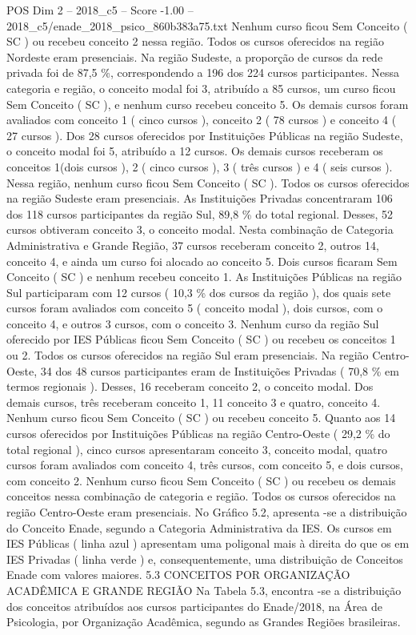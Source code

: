 \begin{textsample}{POS Dim 2 – 2018\_c5 – Score -1.00 – 2018\_c5/enade\_2018\_psico\_860b383a75.txt}
Nenhum curso ficou Sem Conceito ( SC ) ou recebeu conceito 2 nessa região.
Todos os cursos oferecidos na região Nordeste eram presenciais.
Na região Sudeste, a proporção de cursos da rede privada foi de 87,5 \%, correspondendo a 196 dos 224 cursos participantes.
Nessa categoria e região, o conceito modal foi 3, atribuído a 85 cursos, um curso ficou Sem Conceito ( SC ), e nenhum curso recebeu conceito 5.
Os demais cursos foram avaliados com conceito 1 ( cinco cursos ), conceito 2 ( 78 cursos ) e conceito 4 ( 27 cursos ).
Dos 28 cursos oferecidos por Instituições Públicas na região Sudeste, o conceito modal foi 5, atribuído a 12 cursos.
Os demais cursos receberam os conceitos 1(dois cursos ), 2 ( cinco cursos ), 3 ( três cursos ) e 4 ( seis cursos ).
Nessa região, nenhum curso ficou Sem Conceito ( SC ).
Todos os cursos oferecidos na região Sudeste eram presenciais.
As Instituições Privadas concentraram 106 dos 118 cursos participantes da região Sul, 89,8 \% do total regional.
Desses, 52 cursos obtiveram conceito 3, o conceito modal.
Nesta combinação de Categoria Administrativa e Grande Região, 37 cursos receberam conceito 2, outros 14, conceito 4, e ainda um curso foi alocado ao conceito 5.
Dois cursos ficaram Sem Conceito ( SC ) e nenhum recebeu conceito 1.
As Instituições Públicas na região Sul participaram com 12 cursos ( 10,3 \% dos cursos da região ), dos quais sete cursos foram avaliados com conceito 5 ( conceito modal ), dois cursos, com o conceito 4, e outros 3 cursos, com o conceito 3.
Nenhum curso da região Sul oferecido por IES Públicas ficou Sem Conceito ( SC ) ou recebeu os conceitos 1 ou 2.
Todos os cursos oferecidos na região Sul eram presenciais.
Na região Centro-Oeste, 34 dos 48 cursos participantes eram de Instituições Privadas ( 70,8 \% em termos regionais ).
Desses, 16 receberam conceito 2, o conceito modal.
Dos demais cursos, três receberam conceito 1, 11 conceito 3 e quatro, conceito 4.
Nenhum curso ficou Sem Conceito ( SC ) ou recebeu conceito 5.
Quanto aos 14 cursos oferecidos por Instituições Públicas na região Centro-Oeste ( 29,2 \% do total regional ), cinco cursos apresentaram conceito 3, conceito modal, quatro cursos foram avaliados com conceito 4, três cursos, com conceito 5, e dois cursos, com conceito 2.
Nenhum curso ficou Sem Conceito ( SC ) ou recebeu os demais conceitos nessa combinação de categoria e região.
Todos os cursos oferecidos na região Centro-Oeste eram presenciais.
No Gráfico 5.2, apresenta -se a distribuição do Conceito Enade, segundo a Categoria Administrativa da IES.
Os cursos em IES Públicas ( linha azul ) apresentam uma poligonal mais à direita do que os em IES Privadas ( linha verde ) e, consequentemente, uma distribuição de Conceitos Enade com valores maiores. 5.3 CONCEITOS POR ORGANIZAÇÃO ACADÊMICA E GRANDE REGIÃO Na Tabela 5.3, encontra -se a distribuição dos conceitos atribuídos aos cursos participantes do Enade/2018, na Área de Psicologia, por Organização Acadêmica, segundo as Grandes Regiões brasileiras.

\end{textsample}
